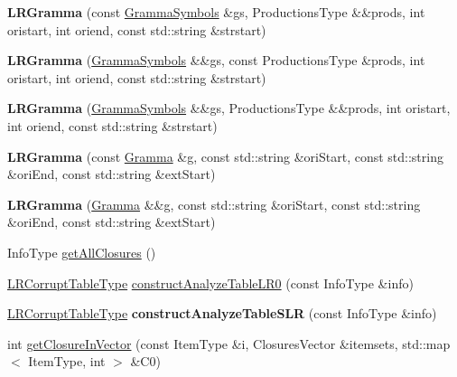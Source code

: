 \begin{DoxyCompactItemize}
{\bfseries L\+R\+Gramma} (const \hyperlink{classx2_1_1_gramma_symbols}{Gramma\+Symbols} \&gs, Productions\+Type \&\&prods, int oristart, int oriend, const std\+::string \&strstart)
\item 
\mbox{\label{classx2_1_1_l_r_gramma_aaa21674847491a3145be5c3ba32c094d}} 
{\bfseries L\+R\+Gramma} (\hyperlink{classx2_1_1_gramma_symbols}{Gramma\+Symbols} \&\&gs, const Productions\+Type \&prods, int oristart, int oriend, const std\+::string \&strstart)
\item 
\mbox{\label{classx2_1_1_l_r_gramma_aee0d20fc4dea94380d6912ddd6b526c7}} 
{\bfseries L\+R\+Gramma} (\hyperlink{classx2_1_1_gramma_symbols}{Gramma\+Symbols} \&\&gs, Productions\+Type \&\&prods, int oristart, int oriend, const std\+::string \&strstart)
\item 
\mbox{\label{classx2_1_1_l_r_gramma_a1c9cea6688bcf7ec1dce11cdcceb4189}} 
{\bfseries L\+R\+Gramma} (const \hyperlink{classx2_1_1_gramma}{Gramma} \&g, const std\+::string \&ori\+Start, const std\+::string \&ori\+End, const std\+::string \&ext\+Start)
\item 
\mbox{\label{classx2_1_1_l_r_gramma_a89d445f6a3d58250f486d5261afca6fd}} 
{\bfseries L\+R\+Gramma} (\hyperlink{classx2_1_1_gramma}{Gramma} \&\&g, const std\+::string \&ori\+Start, const std\+::string \&ori\+End, const std\+::string \&ext\+Start)
\item 
Info\+Type \hyperlink{classx2_1_1_l_r_gramma_a03deaa81155f09b014629b32769b8228}{get\+All\+Closures} ()
\item 
\hyperlink{classx2_1_1_gramma_a03901eb5b196689b901fbf23e5bb9f0e}{L\+R\+Corrupt\+Table\+Type} \hyperlink{classx2_1_1_l_r_gramma_a93fdb0ff53f9960980ff955b318e1883}{construct\+Analyze\+Table\+L\+R0} (const Info\+Type \&info)
\item 
\mbox{\label{classx2_1_1_l_r_gramma_a0d56a6e69eccb330110304642ca0aca2}} 
\hyperlink{classx2_1_1_gramma_a03901eb5b196689b901fbf23e5bb9f0e}{L\+R\+Corrupt\+Table\+Type} {\bfseries construct\+Analyze\+Table\+S\+LR} (const Info\+Type \&info)
\item 
int \hyperlink{classx2_1_1_l_r_gramma_a6f9db2e24c2f5ccdbeb7f2a5c3e6f46e}{get\+Closure\+In\+Vector} (const Item\+Type \&i, Closures\+Vector \&itemsets, std\+::map$<$ Item\+Type, int $>$ \&C0)

\end{DoxyCompactItemize}
